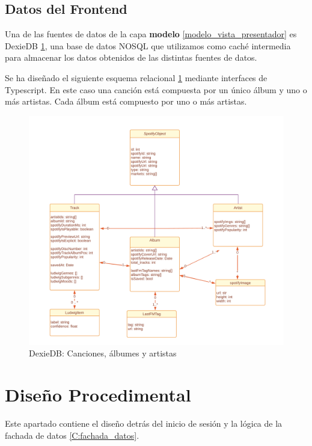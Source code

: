 \clearpage

\subsection{Datos del Frontend} \label{C:datos_front}

Una de las fuentes de datos de la capa \textbf{modelo} \ref{modelo_vista_presentador} es DexieDB \ref{fig:c:dexie}, una base de datos NOSQL que utilizamos como caché intermedia para almacenar los datos obtenidos de las distintas fuentes de datos. 

Se ha diseñado el siguiente esquema relacional \ref{fig:c:dexie} mediante interfaces de Typescript. En este caso una canción está compuesta por un único álbum y uno o más artistas. Cada álbum está compuesto por uno o más artistas.

\begin{figure}
    \centering
    \includegraphics[width=\linewidth]{img/C/data_cache.png}
    \caption{DexieDB: Canciones, álbumes y artistas}
    \label{fig:c:dexie}
\end{figure}



\section{Diseño Procedimental}

Este apartado contiene el diseño detrás del inicio de sesión y la lógica de la fachada de datos \ref{C:fachada_datos}.



